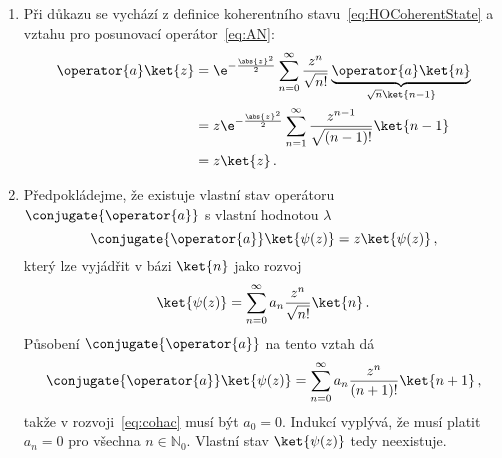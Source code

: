 \begin{solution}
    \begin{enumerate}
		\item 
			Při důkazu se vychází z definice koherentního stavu~\eqref{eq:HOCoherentState} a vztahu pro posunovací operátor~\eqref{eq:AN}:
			\begin{align}
				\operator{a}\ket{z}
					&=\e^{-\frac{\abs{z}^{2}}{2}}\sum_{n=0}^{\infty}
						\frac{z^{n}}{\sqrt{n!}}\underbrace{\operator{a}\ket{n}}_{\sqrt{n}\ket{n-1}}\nonumber\\
					&=z\e^{-\frac{\abs{z}^{2}}{2}}\sum_{n=1}^{\infty}
						\frac{z^{n-1}}{\sqrt{(n-1)!}}\ket{n-1}\nonumber\\
					&=z\ket{z}\,.
			\end{align}
		
		\item
			Předpokládejme, že existuje vlastní stav operátoru $\conjugate{\operator{a}}$ s vlastní hodnotou $\lambda$
			\begin{equation}
				\conjugate{\operator{a}}\ket{\psi(z)}=z\ket{\psi(z)}\,,
			\end{equation}
			který lze vyjádřit v bázi $\ket{n}$ jako rozvoj
			\begin{equation}
				\label{eq:cohac}
				\ket{\psi(z)}=\sum_{n=0}^{\infty}a_{n}\frac{z^{n}}{\sqrt{n!}}\ket{n}\,.
			\end{equation}
			Působení $\conjugate{\operator{a}}$ na tento vztah dá
			\begin{equation}
				\conjugate{\operator{a}}\ket{\psi(z)}=\sum_{n=0}^{\infty}a_{n}\frac{z^{n}}{(n+1)!}\ket{n+1}\,,
			\end{equation}
			takže v rozvoji~\eqref{eq:cohac} musí být $a_{0}=0$.
			Indukcí vyplývá, že musí platit $a_{n}=0$ pro všechna $n\in\mathbb{N}_{0}$.
			Vlastní stav $\ket{\psi(z)}$ tedy neexistuje.
		

\end{enumerate}
\end{solution}
